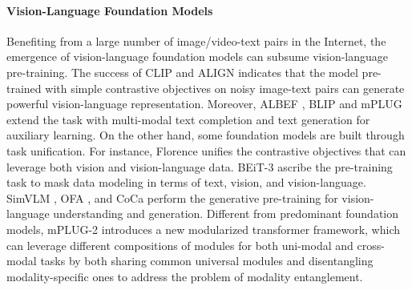 \documentclass{article}
\theoremstyle{plain}
\theoremstyle{definition}
\theoremstyle{remark}
\newcommand{\modelname}{mPLUG-2 }
\begin{document}
\vspace{-2ex}
\paragraph{Vision-Language Foundation Models}
Benefiting from a large number of image/video-text pairs in the Internet, the emergence of vision-language foundation models can subsume vision-language pre-training. The success of CLIP \citep{radford2021learning} and ALIGN \citep{Jia2021ScalingUV} indicates that the model pre-trained with simple contrastive objectives on noisy image-text pairs can generate powerful vision-language representation. Moreover, ALBEF \citep{li2021align}, BLIP \citep{li2022blip} and mPLUG \citep{Li2022mPLUGEA} extend the task with multi-modal text completion and text generation for auxiliary learning. On the other hand, some foundation models are built through task unification. For instance, Florence \citep{yuan2021florence} unifies the contrastive objectives that can leverage both vision and vision-language data. BEiT-3 \citep{Wang2022BEITv3} ascribe the pre-training task to mask data modeling in terms of text, vision, and vision-language. SimVLM \citep{wang2021simvlm}, OFA \citep{Wang2022OFA}, and CoCa \citep{Yu2022CoCaCC} perform the generative pre-training for vision-language understanding and generation. 
Different from predominant foundation models, \modelname introduces a new modularized transformer framework, which can leverage different compositions of modules for both uni-modal and cross-modal tasks by both sharing common universal modules and disentangling modality-specific ones to address the problem of modality entanglement. 
\end{document}

